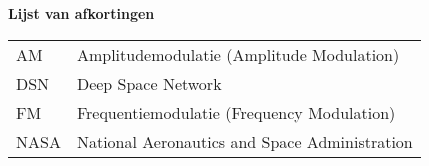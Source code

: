 \Large
\textbf{Lijst van afkortingen}
\newline
\small
\begin{table}[ht]
\small
\begin{tabular}{ll} 
AM &Amplitudemodulatie (Amplitude Modulation) \\
DSN &Deep Space Network\\
FM &Frequentiemodulatie (Frequency Modulation) \\
NASA &National Aeronautics and Space Administration \\
\end{tabular}
\end{table}

\newpage
